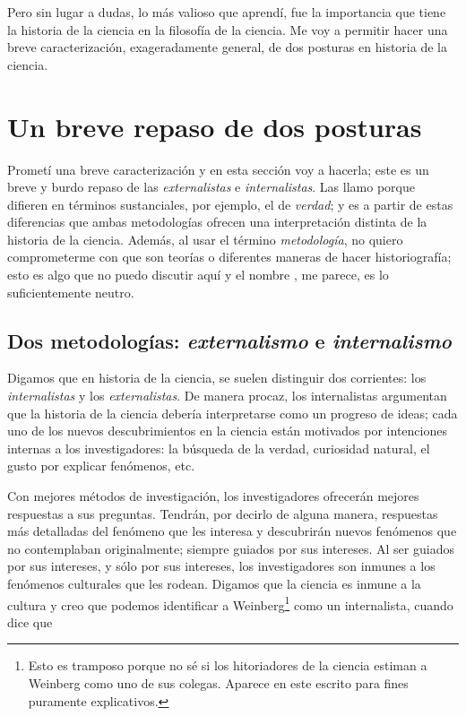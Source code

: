 Pero sin lugar a dudas, lo más valioso que aprendí, fue la importancia que tiene la historia de la ciencia en la filosofía de la ciencia.
Me voy a permitir hacer una breve caracterización, exageradamente general, de dos posturas en historia de la ciencia.


\section{Un breve repaso de dos posturas}

Prometí una breve caracterización y en esta sección voy a hacerla; este es un breve y burdo repaso de las  \emph{externalistas} e \emph{internalistas}.
Las llamo  porque difieren en términos sustanciales, por ejemplo, el de \emph{verdad}; y es a partir de estas diferencias que ambas metodologías ofrecen una interpretación distinta de la historia de la ciencia.
Además, al usar el término \emph{metodología}, no quiero comprometerme con que son teorías o diferentes maneras de hacer historiografía; esto es algo que no puedo discutir aquí y el nombre , me parece, es lo suficientemente neutro.


\subsection{Dos metodologías: \emph{externalismo} e \emph{internalismo}}

\noindent Digamos que en historia de la ciencia, se suelen distinguir dos corrientes: los \emph{internalistas} y los \emph{externalistas}.
De manera procaz, los internalistas argumentan que la historia de la ciencia debería interpretarse como un progreso de ideas; cada uno de los nuevos descubrimientos en la ciencia están motivados por intenciones internas a los investigadores: la búsqueda de la verdad, curiosidad natural, el gusto por explicar fenómenos, etc.

Con mejores métodos de investigación, los investigadores ofrecerán mejores respuestas a sus preguntas.
Tendrán, por decirlo de alguna manera, respuestas más detalladas del fenómeno que les interesa y descubrirán nuevos fenómenos que no contemplaban originalmente; siempre guiados por sus intereses.
Al ser guiados por sus intereses, y sólo por sus intereses, los investigadores son inmunes a los fenómenos culturales que les rodean.
Digamos que la ciencia es inmune a la cultura y creo que podemos identificar a Weinberg\footnote{
	Esto es tramposo porque no sé si los hitoriadores de la ciencia estiman a Weinberg como uno de sus colegas.
	Aparece en este escrito para fines puramente explicativos.
} como un internalista, cuando dice que

